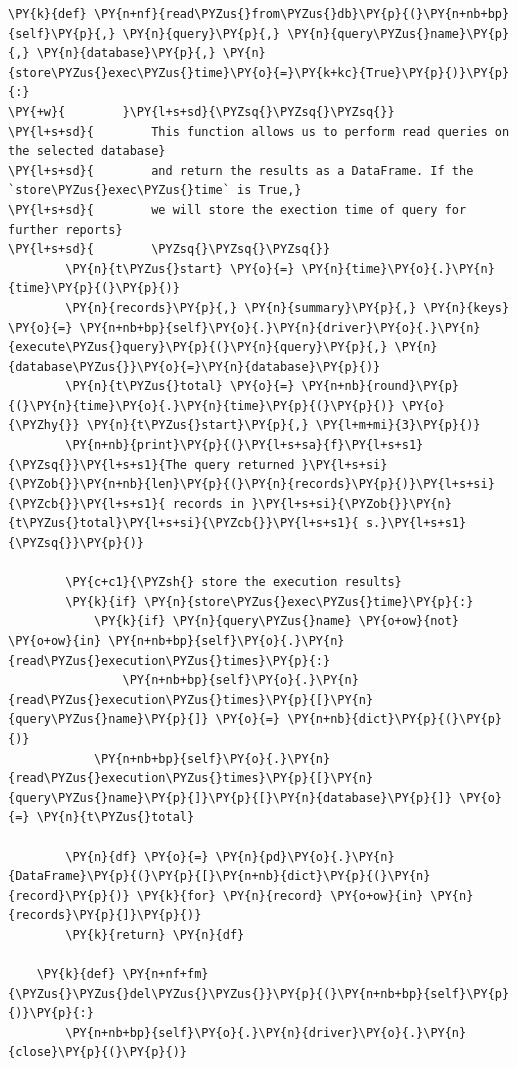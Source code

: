 \begin{tcolorbox}[breakable, size=fbox, boxrule=1pt, pad at break*=1mm,colback=cellbackground, colframe=cellborder]
\begin{Verbatim}[commandchars=\\\{\}]
    \PY{k}{def} \PY{n+nf}{read\PYZus{}from\PYZus{}db}\PY{p}{(}\PY{n+nb+bp}{self}\PY{p}{,} \PY{n}{query}\PY{p}{,} \PY{n}{query\PYZus{}name}\PY{p}{,} \PY{n}{database}\PY{p}{,} \PY{n}{store\PYZus{}exec\PYZus{}time}\PY{o}{=}\PY{k+kc}{True}\PY{p}{)}\PY{p}{:}
\PY{+w}{        }\PY{l+s+sd}{\PYZsq{}\PYZsq{}\PYZsq{}}
\PY{l+s+sd}{        This function allows us to perform read queries on the selected database}
\PY{l+s+sd}{        and return the results as a DataFrame. If the `store\PYZus{}exec\PYZus{}time` is True,}
\PY{l+s+sd}{        we will store the exection time of query for further reports}
\PY{l+s+sd}{        \PYZsq{}\PYZsq{}\PYZsq{}}
        \PY{n}{t\PYZus{}start} \PY{o}{=} \PY{n}{time}\PY{o}{.}\PY{n}{time}\PY{p}{(}\PY{p}{)}
        \PY{n}{records}\PY{p}{,} \PY{n}{summary}\PY{p}{,} \PY{n}{keys} \PY{o}{=} \PY{n+nb+bp}{self}\PY{o}{.}\PY{n}{driver}\PY{o}{.}\PY{n}{execute\PYZus{}query}\PY{p}{(}\PY{n}{query}\PY{p}{,} \PY{n}{database\PYZus{}}\PY{o}{=}\PY{n}{database}\PY{p}{)}
        \PY{n}{t\PYZus{}total} \PY{o}{=} \PY{n+nb}{round}\PY{p}{(}\PY{n}{time}\PY{o}{.}\PY{n}{time}\PY{p}{(}\PY{p}{)} \PY{o}{\PYZhy{}} \PY{n}{t\PYZus{}start}\PY{p}{,} \PY{l+m+mi}{3}\PY{p}{)}
        \PY{n+nb}{print}\PY{p}{(}\PY{l+s+sa}{f}\PY{l+s+s1}{\PYZsq{}}\PY{l+s+s1}{The query returned }\PY{l+s+si}{\PYZob{}}\PY{n+nb}{len}\PY{p}{(}\PY{n}{records}\PY{p}{)}\PY{l+s+si}{\PYZcb{}}\PY{l+s+s1}{ records in }\PY{l+s+si}{\PYZob{}}\PY{n}{t\PYZus{}total}\PY{l+s+si}{\PYZcb{}}\PY{l+s+s1}{ s.}\PY{l+s+s1}{\PYZsq{}}\PY{p}{)}

        \PY{c+c1}{\PYZsh{} store the execution results}
        \PY{k}{if} \PY{n}{store\PYZus{}exec\PYZus{}time}\PY{p}{:}
            \PY{k}{if} \PY{n}{query\PYZus{}name} \PY{o+ow}{not} \PY{o+ow}{in} \PY{n+nb+bp}{self}\PY{o}{.}\PY{n}{read\PYZus{}execution\PYZus{}times}\PY{p}{:}
                \PY{n+nb+bp}{self}\PY{o}{.}\PY{n}{read\PYZus{}execution\PYZus{}times}\PY{p}{[}\PY{n}{query\PYZus{}name}\PY{p}{]} \PY{o}{=} \PY{n+nb}{dict}\PY{p}{(}\PY{p}{)}
            \PY{n+nb+bp}{self}\PY{o}{.}\PY{n}{read\PYZus{}execution\PYZus{}times}\PY{p}{[}\PY{n}{query\PYZus{}name}\PY{p}{]}\PY{p}{[}\PY{n}{database}\PY{p}{]} \PY{o}{=} \PY{n}{t\PYZus{}total}
        
        \PY{n}{df} \PY{o}{=} \PY{n}{pd}\PY{o}{.}\PY{n}{DataFrame}\PY{p}{(}\PY{p}{[}\PY{n+nb}{dict}\PY{p}{(}\PY{n}{record}\PY{p}{)} \PY{k}{for} \PY{n}{record} \PY{o+ow}{in} \PY{n}{records}\PY{p}{]}\PY{p}{)}
        \PY{k}{return} \PY{n}{df}
    
    \PY{k}{def} \PY{n+nf+fm}{\PYZus{}\PYZus{}del\PYZus{}\PYZus{}}\PY{p}{(}\PY{n+nb+bp}{self}\PY{p}{)}\PY{p}{:}
        \PY{n+nb+bp}{self}\PY{o}{.}\PY{n}{driver}\PY{o}{.}\PY{n}{close}\PY{p}{(}\PY{p}{)}
\end{Verbatim}
\end{tcolorbox}

